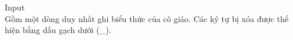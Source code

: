 Input
\\   Gồm một dòng duy nhất ghi biểu thức của cô giáo. Các ký tự bị xóa được thể hiện bằng dấu gạch dưới (\_).
